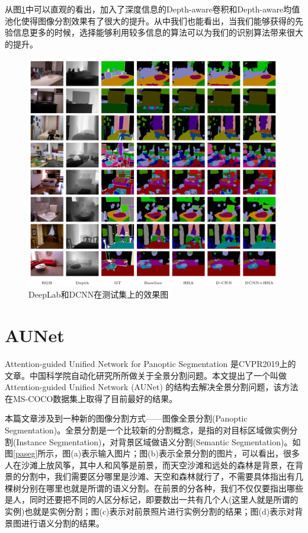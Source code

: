 \documentclass[cn]{elegantbook}
\begin{document}
从图\ref{res2}中可以直观的看出，加入了深度信息的Depth-aware卷积和Depth-aware均值池化使得图像分割效果有了很大的提升。从中我们也能看出，当我们能够获得的先验信息更多的时候，选择能够利用较多信息的算法可以为我们的识别算法带来很大的提升。
\begin{figure}[h]
	\centering
	\includegraphics[width=\textwidth]{images/res2.png}
	\caption{\label{res2}DeepLab和DCNN在测试集上的效果图}
\end{figure}

\section{AUNet}
Attention-guided Unified Network for Panoptic Segmentation\cite{li2018attention} 是CVPR2019上的文章。中国科学院自动化研究所所做关于全景分割问题。本文提出了一个叫做 Attention-guided Unified Network (AUNet) 的结构去解决全景分割问题，该方法在MS-COCO数据集上取得了目前最好的结果。

本篇文章涉及到一种新的图像分割方式——图像全景分割(Panoptic Segmentation)。全景分割是一个比较新的分割概念，是指的对目标区域做实例分割(Instance Segmentation)，对背景区域做语义分割(Semantic Segmentation)。如图\ref{paseg}所示，图(a)表示输入图片；图(b)表示全景分割的图片，可以看出，很多人在沙滩上放风筝，其中人和风筝是前景，而天空沙滩和远处的森林是背景，在背景的分割中，我们需要区分哪里是沙滩、天空和森林就行了，不需要具体指出有几棵树分别在哪里也就是所谓的语义分割。在前景的分各种，我们不仅仅要指出哪些是人，同时还要把不同的人区分标记，即要数出一共有几个人(这里人就是所谓的实例)也就是实例分割；图(c)表示对前景照片进行实例分割的结果；图(d)表示对背景图进行语义分割的结果。
\end{document}
